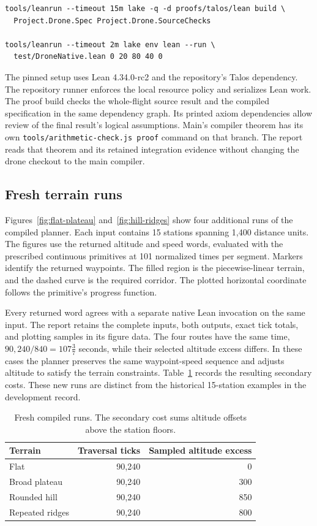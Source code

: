 \documentclass[11pt]{article}
\begin{document}
\begin{lstlisting}
tools/leanrun --timeout 15m lake -q -d proofs/talos/lean build \
  Project.Drone.Spec Project.Drone.SourceChecks

tools/leanrun --timeout 2m lake env lean --run \
  test/DroneNative.lean 0 20 80 40 0
\end{lstlisting}

The pinned setup uses Lean 4.34.0-rc2 and the repository's Talos dependency.  The repository runner enforces the local resource policy and serializes Lean work.  The proof build checks the whole-flight source result and the compiled specification in the same dependency graph.  Its printed axiom dependencies allow review of the final result's logical assumptions.  Main's compiler theorem has its own \texttt{tools/arithmetic-check.js proof} command on that branch.  The report reads that theorem and its retained integration evidence without changing the drone checkout to the main compiler.


\subsection{Fresh terrain runs}

Figures~\ref{fig:flat-plateau} and~\ref{fig:hill-ridges} show four additional runs of the compiled planner.  Each input contains 15 stations spanning 1,400 distance units.  The figures use the returned altitude and speed words, evaluated with the prescribed continuous primitives at 101 normalized times per segment.  Markers identify the returned waypoints.  The filled region is the piecewise-linear terrain, and the dashed curve is the required corridor.  The plotted horizontal coordinate follows the primitive's progress function.

Every returned word agrees with a separate native Lean invocation on the same input.  The report retains the complete inputs, both outputs, exact tick totals, and plotting samples in its figure data.  The four routes have the same time, $90{,}240/840=107\tfrac{3}{7}$ seconds, while their selected altitude excess differs.  In these cases the planner preserves the same waypoint-speed sequence and adjusts altitude to satisfy the terrain constraints.  Table~\ref{tab:runs} records the resulting secondary costs.  These new runs are distinct from the historical 15-station examples in the development record.

\begin{table}[htbp]
\centering
\begin{tabular}{lrr}
\toprule
Terrain & Traversal ticks & Sampled altitude excess\\
\midrule
Flat & 90,240 & 0\\
Broad plateau & 90,240 & 300\\
Rounded hill & 90,240 & 850\\
Repeated ridges & 90,240 & 800\\
\bottomrule
\end{tabular}
\caption{Fresh compiled runs.  The secondary cost sums altitude offsets above the station floors.}
\label{tab:runs}
\end{table}
\end{document}
